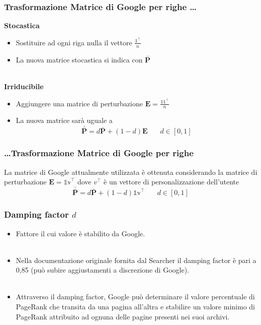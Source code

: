\documentclass{beamer}
\begin{document}
\begin{frame}
	\frametitle{Trasformazione Matrice di Google per righe \dots}
	\textbf{Stocastica}
		\begin{itemize}
			\item Sostituire ad ogni riga nulla il vettore $\frac{\mathbb{1}^\intercal}{n}$
			\item La nuova matrice stocastica si indica con $\bar{\textbf{P}}$\\~\\
		\end{itemize}
	\textbf{Irriducibile}
		\begin{itemize}
			\item Aggiungere una matrice di perturbazione $\textbf{E} = \frac{\mathbb{11}^\intercal}{n}$
			\item La nuova matrice sarà uguale a  $$\bar{\bar{\textbf{P}}} = d\bar{\textbf{P}} + (1-d)\textbf{E} ~~~~~~~~ d \in [0,1]$$
		\end{itemize}
\end{frame}

\begin{frame}
	\frametitle{\dots Trasformazione Matrice di Google per righe}
	La matrice di Google attualmente utilizzata è ottenuta considerando la matrice di perturbazione  $\textbf{E} = \mathbb{1v}^\intercal$ dove $v^\intercal$ è un vettore di personalizzazione dell'utente $$\bar{\bar{\textbf{P}}} = d\bar{\textbf{P}} + (1-d)\mathbb{1v}^\intercal ~~~~~~~~ d \in [0,1]$$
\end{frame}
\begin{frame}
	\frametitle{Damping factor $d$}
	\begin{itemize}
		\item Fattore il cui valore è stabilito da Google.\\~\\
		\item Nella documentazione originale fornita dal Searcher il damping factor è pari a 0,85 (può subire aggiustamenti a discrezione di Google).\\~\\
		\item Attraverso il damping factor, Google può determinare il valore percentuale di PageRank che transita da una pagina all'altra e stabilire un valore minimo di PageRank attribuito ad ognuna delle pagine presenti nei suoi archivi.
	\end{itemize}
\end{frame}
\end{document}
